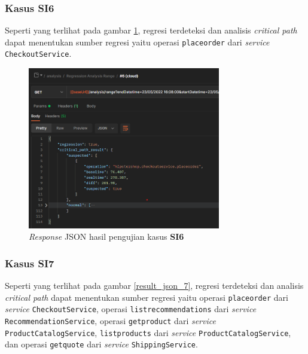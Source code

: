 \subsubsection{Kasus SI6}
Seperti yang terlihat pada gambar \ref{result_json_6}, regresi terdeteksi dan analisis \textit{critical path} dapat menentukan sumber regresi yaitu operasi \texttt{placeorder} dari \textit{service} \texttt{CheckoutService}.
\begin{figure}[!htb]
	\centering
	\includegraphics[width=0.75\textwidth]{resources/ch4/json/6.png}
	\caption{\textit{Response} JSON hasil pengujian kasus \textbf{SI6}}
	\label{result_json_6}
\end{figure}


\subsubsection{Kasus SI7}
Seperti yang terlihat pada gambar \ref{result_json_7}, regresi terdeteksi dan analisis \textit{critical path} dapat menentukan sumber regresi yaitu operasi \texttt{placeorder} dari \textit{service} \texttt{CheckoutService}, operasi \texttt{listrecommendations} dari \textit{service} \texttt{RecommendationService}, operasi \texttt{getproduct} dari \textit{service} \texttt{ProductCatalogService}, \texttt{listproducts} dari \textit{service} \texttt{ProductCatalogService}, dan operasi \texttt{getquote} dari \textit{service} \texttt{ShippingService}.


